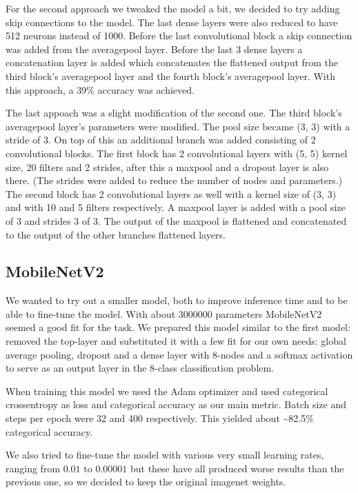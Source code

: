 \documentclass[twocolumn]{article}
\begin{document}
	For the second approach we tweaked the model a bit, we decided to try adding skip connections to the model. The last dense layers were also reduced to have 512 neurons instead of 1000.
	Before the last convolutional block a skip connection was added from the averagepool layer. Before the last 3 dense layers a concatenation layer is added which concatenates the flattened output from the third block's averagepool layer and the fourth block's averagepool layer.
	With this approach, a 39\% accuracy was achieved.
	
	The last appoach was a slight modification of the second one.
	The third block's averagepool layer's parameters were modified. The pool size became (3, 3) with a stride of 3. On top of this an additional branch was added consisting of 2 convolutional blocks. The first block has 2 convolutional layers with (5, 5) kernel size, 20 filters and 2 strides, after this a maxpool and a dropout layer is also there. (The strides were added to reduce the number of nodes and parameters.) 
	The second block has 2 convolutional layers as well with a kernel size of (3, 3) and with 10 and 5 filters respectively. A maxpool layer is added with a pool size of 3 and strides 3 of 3. The output of the maxpool is flattened and concatenated to the output of the other branches flattened layers.
	
	
	\subsection{MobileNetV2}
	
	We wanted to try out a smaller model, both to improve inference time and to be able to fine-tune the model. With about $3000000$ parameters MobileNetV2 seemed a good fit for the task. We prepared this model similar to the first model: removed the top-layer and substituted it with a few fit for our own needs: global average pooling, dropout and a dense layer with 8-nodes and a softmax activation to serve as an output layer in the 8-class classification problem.
	
	When training this model we used the Adam optimizer and used categorical crossentropy as loss and categorical accuracy as our main metric. Batch size and steps per epoch were 32 and 400 respectively. This yielded about \textasciitilde82.5\% categorical accuracy.
	
	We also tried to fine-tune the model with various very small learning rates, ranging from $0.01$ to $0.00001$ but these have all produced worse results than the previous one, so we decided to keep the original imagenet weights.
	
\end{document}
